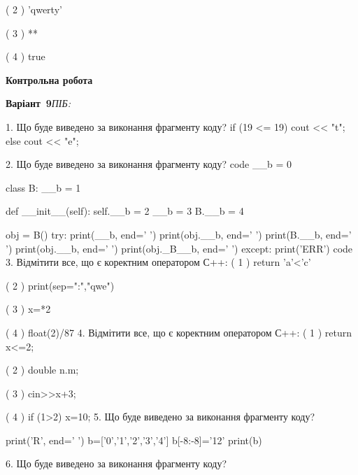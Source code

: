 \documentclass[11pt]{article}
\begin{document}
( 2 ) 'qwerty'

( 3 ) **

( 4 ) true
\vspace{5mm}










\newpage

\newpage

{\large\textbf{Контрольна робота}}

\textbf{Варіант \No\,9}\hfill \textit{ПІБ:}\,\underline{\hspace{60mm}}
\vspace{4mm}

1. Що буде виведено за виконання фрагменту коду?
if (19 <= 19)
    cout << "t";
else
    cout << "e";

\vspace{5mm}
2. Що буде виведено за виконання фрагменту коду?
code
__b = 0

class B:
    __b = 1
    
    def __init__(self):
        self.__b = 2
        __b = 3
        B.__b = 4

obj = B()
try:
    print(__b, end=' ')
    print(obj.__b, end=' ')
    print(B.__b, end=' ')
    print(obj.__b, end=' ')
    print(obj._B__b, end=' ')
except:
    print('ERR')
code
\vspace{5mm}
3. %
Відмітити все, що є коректним оператором С++:
( 1 ) return 'a'<'c'

( 2 ) print(sep=":","qwe")

( 3 ) x=*2

( 4 ) float(2)/87
\vspace{5mm}
4. %
Відмітити все, що є коректним оператором С++:
( 1 ) return x<=2;

( 2 ) double n.m;

( 3 ) cin>>x+3;

( 4 ) if (1>2) x=10;
\vspace{5mm}
5. Що буде виведено за виконання фрагменту коду?

print('R', end=' ')
b=['0','1','2','3','4']
b[-8:-8]='12'
print(b)

\vspace{5mm}
6. Що буде виведено за виконання фрагменту коду?
\end{document}
